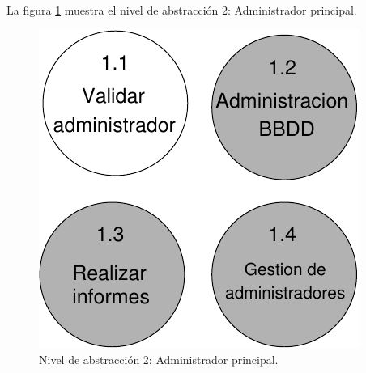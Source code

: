 \paragraph{}La figura \ref{diagramaNivel2-AdmPrincipal} muestra el nivel de
abstracción 2: Administrador principal.

  \begin{figure}[!ht]
    \begin{center}
      \includegraphics[]{08.Analisis_Funcional/8.2.DFDs/Niveles/Nivel2/Diagramas/nivel2-AdmPrincipal.pdf}
      \caption{Nivel de abstracción 2: Administrador principal.}
      \label{diagramaNivel2-AdmPrincipal}
    \end{center}
  \end{figure}
